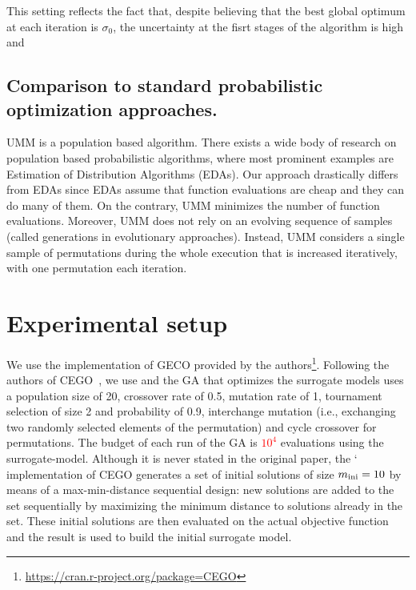 \documentclass[runningheads]{llncs}
\begin{document}
This setting reflects the fact that, despite believing that the best global optimum at each iteration is $\sigma_0$, the uncertainty at the fisrt stages of the algorithm is high and



\subsection{Comparison to standard probabilistic optimization approaches.}
UMM is a population based algorithm. There exists a wide body of research on population based probabilistic algorithms, where most prominent examples are Estimation of Distribution Algorithms (EDAs). Our approach drastically differs from EDAs since EDAs assume that function evaluations are cheap and they can do many of them. On the contrary, UMM minimizes the number of function evaluations. Moreover, UMM does not rely on an evolving sequence of samples (called generations in evolutionary approaches). Instead, UMM considers a single sample of permutations during the whole execution that is increased iteratively, with one permutation each iteration. 









\section{Experimental setup}

We use the implementation of GECO provided by the
authors\footnote{\url{https://cran.r-project.org/package=CEGO}}. Following the
authors of CEGO~\citep{ZaeStoFriFisNauBar2014,ZaeStoBar2014:ppsn}, we use and
the GA that optimizes the surrogate models uses a population size of 20,
crossover rate of 0.5, mutation rate of 1, tournament selection of size 2 and
probability of 0.9, interchange mutation (i.e., exchanging two randomly
selected elements of the permutation) and cycle crossover for permutations. The
budget of each run of the GA is \textcolor{red}{$10^4$} evaluations using the
surrogate-model. Although it is never stated in the original paper, the	`
implementation of CEGO generates a set of initial solutions of size
$m_\text{ini}=10$ by means of a max-min-distance sequential design: new solutions
are added to the set sequentially by maximizing the minimum distance to
solutions already in the set. These initial solutions are then evaluated on the
actual objective function and the result is used to build the initial surrogate
model.%
\end{document}
